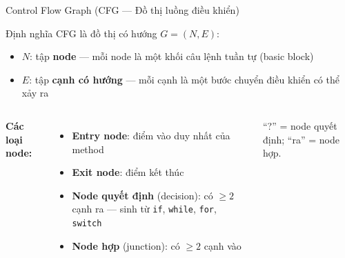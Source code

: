 \documentclass[aspectratio=169,12pt]{beamer}
\begin{document}
\begin{frame}[shrink=8]{Control Flow Graph (CFG --- Đồ thị luồng điều khiển)}
  \begin{block}{Định nghĩa}
    CFG là đồ thị có hướng $G = (N, E)$:
    \begin{itemize}
      \item $N$: tập \textbf{node} --- mỗi node là một khối câu lệnh
            tuần tự (basic block)
      \item $E$: tập \textbf{cạnh có hướng} --- mỗi cạnh là một bước chuyển
            điều khiển có thể xảy ra
    \end{itemize}
  \end{block}

  \begin{columns}
    \textbf{Các loại node:}
    \begin{itemize}
      \item \textbf{Entry node}: điểm vào duy nhất của method
      \item \textbf{Exit node}: điểm kết thúc
      \item \textbf{Node quyết định} (decision): có $\geq 2$ cạnh ra
        --- sinh từ \texttt{if}, \texttt{while}, \texttt{for}, \texttt{switch}
      \item \textbf{Node hợp} (junction): có $\geq 2$ cạnh vào
    \end{itemize}

    \centering
    \par
    {\scriptsize ``?'' = node quyết định; ``ra'' = node hợp.\par}
  \end{columns}
\end{frame}
\end{document}
